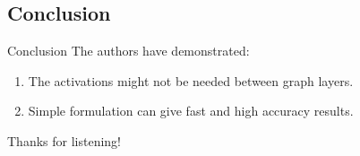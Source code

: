 \documentclass{beamer}
\begin{document}
    \subsection{Conclusion}

    \begin{frame}{Conclusion}
        \pause
        The authors have demonstrated:
        \pause
        \begin{enumerate}
            \item The activations might not be needed between graph layers.
            \pause
            \item Simple formulation can give fast and high accuracy results.
        \end{enumerate}
    \end{frame}

    \begin{frame}[focus]
        Thanks for listening!
    \end{frame}

    \appendix
    \begin{frame}[allowframebreaks]
        \nocite{*}
        
        
    \end{frame}
\end{document}
